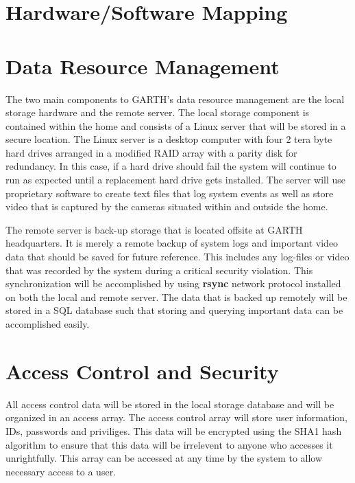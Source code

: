 \documentclass{report}
\begin{document}
\section{Hardware/Software Mapping}

\section{Data Resource Management}

The two main components to GARTH's data resource management are the local
storage hardware and the remote server. The local storage component is
contained within the home and consists of a Linux server that will be stored in
a secure location. The Linux server is a desktop computer with four 2 tera byte
hard drives arranged in a modified RAID array with a parity disk for
redundancy. In this case, if a hard drive should fail the system will continue
to run as expected until a replacement hard drive gets installed. The server
will use proprietary software  to create text files that log system events as
well as store video that is captured by the cameras situated within and outside
the home.

The remote server is back-up storage that is located offsite at GARTH
headquarters. It is merely a remote backup of system logs and important video
data that should be saved for future reference. This includes any log-files or
video that was recorded by the system during a critical security violation. This
synchronization will be accomplished by using \textbf{rsync} network protocol
installed on both the local and remote server. The data that is backed up
remotely will be stored in a SQL database such that storing and querying
important data can be accomplished easily.

\section{Access Control and Security}

All access control data will be stored in the local storage database and will be
organized in an access array. The access control array will store user
information, IDs, passwords and priviliges.  This data will be encrypted using
the SHA1 hash algorithm to ensure that this data will be irrelevent to anyone
who accesses it unrightfully. This array can be accessed at any time by the
system to allow necessary access to a user. 
\end{document}
